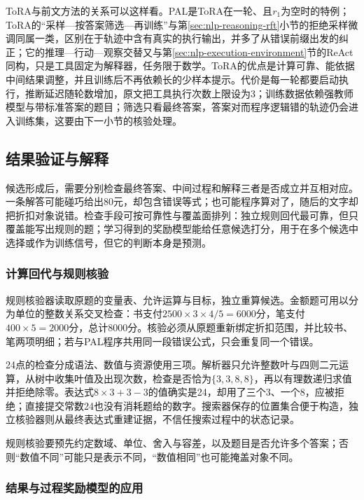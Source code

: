 ToRA与前文方法的关系可以这样看。PAL是ToRA在一轮、且$r_1$为空时的特例；ToRA的“采样—按答案筛选—再训练”与第\ref{sec:nlp-reasoning-rft}小节的拒绝采样微调同属一类，区别在于轨迹中含有真实的执行输出，并多了从错误前缀出发的纠正；它的推理—行动—观察交替又与第\ref{sec:nlp-execution-environment}节的ReAct同构，只是工具固定为解释器，任务限于数学。ToRA的优点是计算可靠、能依据中间结果调整，并且训练后不再依赖长的少样本提示。代价是每一轮都要启动执行，推断延迟随轮数增加，原文把工具执行次数上限设为3；训练数据依赖强教师模型与带标准答案的题目；筛选只看最终答案，答案对而程序逻辑错的轨迹仍会进入训练集，这要由下一小节的核验处理。

\subsection{结果验证与解释}
\label{sec:nlp-execution-verification}

候选形成后，需要分别检查最终答案、中间过程和解释三者是否成立并互相对应。一条解答可能碰巧给出80元，却包含错误等式；也可能程序算对了，随后的文字却把折扣对象说错。检查手段可按可靠性与覆盖面排列：独立规则回代最可靠，但只覆盖能写出规则的题；学习得到的奖励模型能给任意候选打分，用于在多个候选中选择或作为训练信号，但它的判断本身是预测。

\subsubsection{计算回代与规则核验}
\label{sec:nlp-execution-rule-check}

规则核验器读取原题的变量表、允许运算与目标，独立重算候选。金额题可用以分为单位的整数关系交叉检查：书支付$2500\times3\times4/5=6000$分，笔支付$400\times5=2000$分，总计8000分。核验必须从原题重新绑定折扣范围，并比较书、笔两项明细；若与PAL程序共用同一段错误公式，只会重复同一个错误。

24点的检查分成语法、数值与资源使用三项。解析器只允许整数叶与四则二元运算，从树中收集叶值及出现次数，检查是否恰为$\{3,3,8,8\}$，再以有理数递归求值并拒绝除零。表达式$8\times3+3-3$的值确实是24，却用了三个3、一个8，应被拒绝；直接提交常数24也没有消耗题给的数字。搜索器保存的位置集合便于构造，独立核验器则从最终表达式重建证据，不信任搜索过程中的状态记录。

规则核验要预先约定数域、单位、舍入与容差，以及题目是否允许多个答案；否则“数值不同”可能只是表示不同，“数值相同”也可能掩盖对象不同。

\subsubsection{结果与过程奖励模型的应用}
\label{sec:nlp-execution-reward-models}

